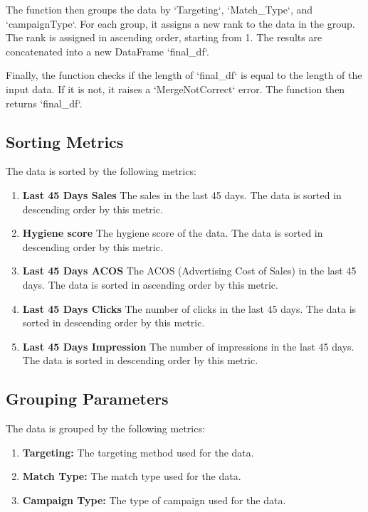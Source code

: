 The function then groups the data by `Targeting`, `Match\_Type`, and `campaignType`. For each group, it assigns a new rank to the data in the group. The rank is assigned in ascending order, starting from 1. The results are concatenated into a new DataFrame `final\_df`.

Finally, the function checks if the length of `final\_df` is equal to the length of the input data. If it is not, it raises a `MergeNotCorrect` error. The function then returns `final\_df`.


\subsection{Sorting Metrics}

The data is sorted by the following metrics:

\begin{enumerate}
    \item \textbf{Last 45 Days Sales} The sales in the last 45 days. The data is sorted in descending order by this metric.
    \item \textbf{Hygiene score} The hygiene score of the data. The data is sorted in descending order by this metric.
    \item \textbf{Last 45 Days ACOS} The ACOS (Advertising Cost of Sales) in the last 45 days. The data is sorted in ascending order by this metric.
    \item \textbf{Last 45 Days Clicks} The number of clicks in the last 45 days. The data is sorted in descending order by this metric.
    \item \textbf{Last 45 Days Impression} The number of impressions in the last 45 days. The data is sorted in descending order by this metric.
\end{enumerate}

\subsection{Grouping Parameters}

The data is grouped by the following metrics:

\begin{enumerate}
    \item \textbf{Targeting:} The targeting method used for the data.
    \item \textbf{Match Type:} The match type used for the data.
    \item \textbf{Campaign Type:} The type of campaign used for the data.
\end{enumerate}

